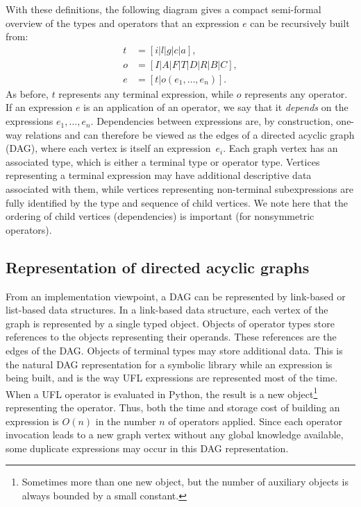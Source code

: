 \documentclass[prodmode,acmtoms]{acmsmall}
\begin{document}
With these definitions, the following diagram gives a compact
semi-formal overview of the types and operators that an expression $e$
can be recursively built from:
\begin{align*}
  t &= [i | l | g | c | a], \\
  o &= [I | A | F | T | D | R | B | C], \\
  e &= [t | o(e_1, \ldots, e_n)].
\end{align*}
As before, $t$ represents any terminal expression, while $o$
represents any operator.  If an expression $e$ is an application of
an operator, we say that it \emph{depends} on the expressions $e_1, \ldots, e_n$.
Dependencies between expressions are, by construction, one-way relations
and can therefore be viewed as the edges of a directed acyclic
graph (DAG), where each vertex is itself an expression~$e_i$. Each
graph vertex has an associated type, which is either a terminal type or
operator type. Vertices representing a terminal expression may have
additional descriptive data associated with them, while vertices
representing non-terminal subexpressions are fully identified by the
type and sequence of child vertices. We note here that the ordering of
child vertices (dependencies) is important (for nonsymmetric operators).

\subsection{Representation of directed acyclic graphs}

From an implementation viewpoint, a DAG can be represented by
link-based or list-based data structures.  In a link-based data
structure, each vertex of the graph is represented by a single typed
object. Objects of operator types store references to the objects
representing their operands. These references are the edges of the
DAG.  Objects of terminal types may store additional data. This is the
natural DAG representation for a symbolic library while an expression
is being built, and is the way UFL expressions are represented most of
the time. When a UFL operator is evaluated in Python, the result is a
new object\footnote{Sometimes more than one new object, but the number
  of auxiliary objects is always bounded by a small constant.}
representing the operator. Thus, both the time and storage cost of
building an expression is $O(n)$ in the number $n$ of operators
applied.  Since each operator invocation leads to a new graph
vertex without any global knowledge available, some duplicate
expressions may occur in this DAG representation.
\end{document}
